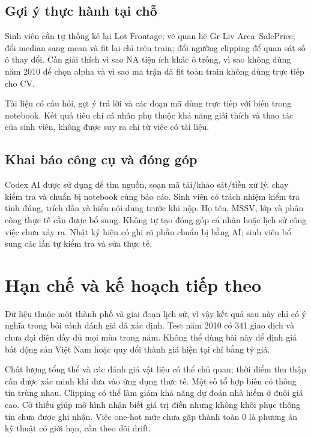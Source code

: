 \documentclass[12pt,a4paper]{article}
\begin{document}
\subsection{Gợi ý thực hành tại chỗ}

Sinh viên cần tự thống kê lại Lot Frontage; vẽ quan hệ Gr Liv Area–SalePrice; đổi median sang mean và fit lại chỉ trên train; đổi ngưỡng clipping để quan sát số ô thay đổi. Cần giải thích vì sao NA tiện ích khác ô trống, vì sao không dùng năm 2010 để chọn alpha và vì sao ma trận đã fit toàn train không dùng trực tiếp cho CV.


Tài liệu  có câu hỏi, gợi ý trả lời và các đoạn mã dùng trực tiếp với biến trong notebook. Kết quả tiêu chí cá nhân phụ thuộc khả năng giải thích và thao tác của sinh viên, không được suy ra chỉ từ việc có tài liệu.


\subsection{Khai báo công cụ và đóng góp}

Codex AI được sử dụng để tìm nguồn, soạn mã tải/khảo sát/tiền xử lý, chạy kiểm tra và chuẩn bị notebook cùng báo cáo. Sinh viên có trách nhiệm kiểm tra tính đúng, trích dẫn và hiểu nội dung trước khi nộp. Họ tên, MSSV, lớp và phân công thực tế cần được bổ sung. Không tự tạo đóng góp cá nhân hoặc lịch sử công việc chưa xảy ra. Nhật ký hiện có ghi rõ phần chuẩn bị bằng AI; sinh viên bổ sung các lần tự kiểm tra và sửa thực tế.


\clearpage

\section{Hạn chế và kế hoạch tiếp theo}

Dữ liệu thuộc một thành phố và giai đoạn lịch sử, vì vậy kết quả sau này chỉ có ý nghĩa trong bối cảnh đánh giá đã xác định. Test năm 2010 có 341 giao dịch và chưa đại diện đầy đủ mọi mùa trong năm. Không thể dùng bài này để định giá bất động sản Việt Nam hoặc quy đổi thành giá hiện tại chỉ bằng tỷ giá.


Chất lượng tổng thể và các đánh giá vật liệu có thể chủ quan; thời điểm thu thập cần được xác minh khi đưa vào ứng dụng thực tế. Một số tổ hợp biến có thông tin trùng nhau. Clipping có thể làm giảm khả năng dự đoán nhà hiếm ở đuôi giá cao. Cờ thiếu giúp mô hình nhận biết giá trị điền nhưng không khôi phục thông tin chưa được ghi nhận. Việc one-hot mức chưa gặp thành toàn 0 là phương án kỹ thuật có giới hạn, cần theo dõi drift.
\end{document}
